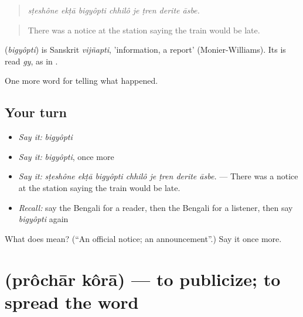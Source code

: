 \begin{quote}
       
\end{quote}

\begin{quote}
\emph{sṭeshône ekṭā bigyôpti chhilô je ṭren derite āsbe.}
\end{quote}

\begin{quote}
There was a notice at the station saying the train would be late.
\end{quote}

\begin{cousinweb}
\textbf{} (\emph{bigyôpti}) is Sanskrit \emph{vijñapti}, 'information, a report' (Monier-Williams). Its  is read \emph{gy}, as in \textbf{}.
\end{cousinweb}

\begin{grammarlens}[title={What you've built}]
One more word for telling what happened.
\end{grammarlens}

\subsection*{Your turn}
\begin{itemize}
\raggedright
  \item \emph{Say it:} \emph{bigyôpti}
  \item \emph{Say it:} \emph{bigyôpti}, once more
  \item \emph{Say it:} \emph{sṭeshône ekṭā bigyôpti chhilô je ṭren derite āsbe.} — There was a notice at the station saying the train would be late.
  \item \emph{Recall:} say the Bengali for a reader, then the Bengali for a listener, then say \emph{bigyôpti} again
\end{itemize}

\begin{tcolorbox}[breakable,colback=teal!4,colframe=teal!35!black,title={Before you move on}]
What does  mean? (\textquotedblleft{}An official notice; an announcement\textquotedblright{}.) Say it once more.
\end{tcolorbox}
\section[\texorpdfstring{\bn{প্রচার} \bn{করা} (prôchār kôrā)}{প্রচার করা (prôchār kôrā)}]{  (prôchār kôrā) — to publicize; to spread the word}


